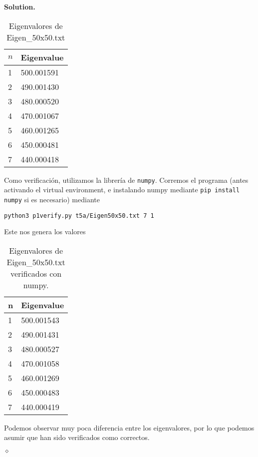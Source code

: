 \documentclass{article}
\theoremstyle{problemstyle}
\newenvironment{solution}{%
  \begin{mdframed}[linewidth=0.8pt,linecolor=Gray,backgroundcolor=Gray!5,roundcorner=5pt]%
  \noindent\textbf{Solution.}%
}{%
\hfill $ \diamond $ 
  \end{mdframed}%
}
\begin{document}
\begin{solution}
\begin{enumerate}
\begin{table}[H]
			      \begin{center}
				      \begin{tabular}{|l|l|}
					      \hline
					      $ n $ & Eigenvalue \\
					      \hline
					      1     & 500.001591 \\
					      \hline
					      2     & 490.001430 \\
					      \hline
					      3     & 480.000520 \\
					      \hline
					      4     & 470.001067 \\
					      \hline
					      5     & 460.001265 \\
					      \hline
					      6     & 450.000481 \\
					      \hline
					      7     & 440.000418 \\
					      \hline
				      \end{tabular}
			      \end{center}
			      \caption{Eigenvalores de Eigen\_50x50.txt}\label{tab:50x50}
		      \end{table}
		      Como verificaci\'on, utilizamos la librer\'ia de \texttt{numpy}. Corremos el programa (antes activando el virtual environment, e instalando numpy mediante \texttt{pip install numpy} si es necesario) mediante
		      \begin{center}
			      \texttt{python3 p1\textunderscore verify.py t5a/Eigen\textunderscore50x50.txt 7 1}
		      \end{center}
		      Este nos genera los valores
		      \begin{table}[H]
			      \begin{center}
				      \begin{tabular}{|l|l|}
					      \hline
					      n & Eigenvalue \\
					      \hline
					      1 & 500.001543 \\
					      \hline
					      2 & 490.001431 \\
					      \hline
					      3 & 480.000527 \\
					      \hline
					      4 & 470.001058 \\
					      \hline
					      5 & 460.001269 \\
					      \hline
					      6 & 450.000483 \\
					      \hline
					      7 & 440.000419 \\
					      \hline
				      \end{tabular}
			      \end{center}
			      \caption{Eigenvalores de Eigen\_50x50.txt verificados con numpy.}\label{tab:py50x50}
		      \end{table}
		      Podemos observar muy poca diferencia entre los eigenvalores, por lo
		      que podemos asumir que han sido verificados como correctos.


\end{enumerate}
\end{solution}
\end{document}

